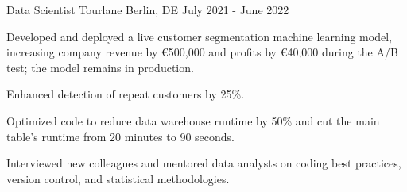 \begin{section}[Experience]
  \entry%
    {Data Scientist} %
    {Tourlane} %
    {Berlin, DE} %
    {July 2021 - June 2022} %
    {%
    \begin{entrylist}
      \item Developed and deployed a live customer segmentation machine learning model, increasing company revenue by €500,000 and profits by €40,000 during the A/B test; the model remains in production.
      \item Enhanced detection of repeat customers by 25\%.
      \item Optimized code to reduce data warehouse runtime by 50\% and cut the main table's runtime from 20 minutes to 90 seconds.
      \item Interviewed new colleagues and mentored data analysts on coding best practices, version control, and statistical methodologies.
    \end{entrylist}
    }%

\end{section}\newpage
